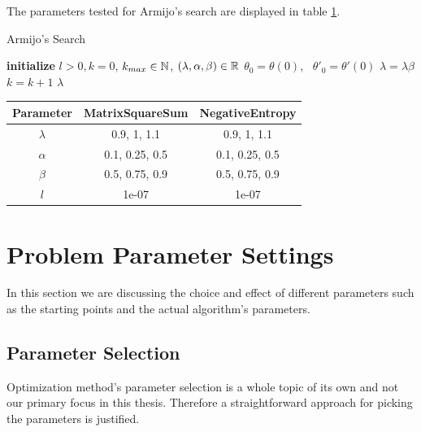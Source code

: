 \documentclass[a4paper,english,titlepage,12pt]{article}
\newcommand{\R}{\ensuremath\mathbb{R}}
\newcommand{\N}{\ensuremath\mathbb{N}}
\begin{document}
The parameters tested for Armijo's search are displayed in table \ref{tab:params_ArmijoSearch}.

\begin{algorithm}[H]
\caption{Armijo's Search}
\label{alg_armijo}
\begin{algorithmic}[1]
\STATE \textbf{initialize} $l > 0, k = 0$, $k_{max} \in \N$, $(\lambda, \alpha, \beta) \in \R$
\STATE $\theta_0 = \theta(0)$, \ $\theta'_0 = \theta'(0)$
    \STATE $\lambda = \lambda \beta$
    \STATE $k = k + 1$
\ENDWHILE
\RETURN $\lambda$
\end{algorithmic}
\end{algorithm}

\begin{table}[H]
\label{tab:params_ArmijoSearch}
\centering
{}
\begin{tabular}{|c|c|c|}
\hline
\rowcolor{gray!25}
Parameter & MatrixSquareSum & NegativeEntropy \\
\hline
$\lambda$ & 0.9, 1, 1.1 & 0.9, 1, 1.1 \\
$\alpha$ & 0.1, 0.25, 0.5 & 0.1, 0.25, 0.5 \\
$\beta$ & 0.5, 0.75, 0.9 & 0.5, 0.75, 0.9 \\
$l$ & 1e-07 & 1e-07 \\
\hline
\end{tabular}
\end{table}



\section{Problem Parameter Settings}

In this section we are discussing the choice and effect of different parameters such as the starting points and the actual algorithm's parameters.

\subsection{Parameter Selection}
\label{sect:parameter_selection}

Optimization method's parameter selection is a whole topic of its own and not our primary focus in this thesis. Therefore a straightforward approach for picking the parameters is justified.
\end{document}
